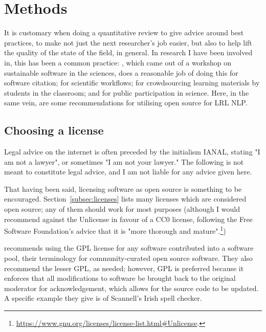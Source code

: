 \section{Methods}
\label{sec:methods}

It is customary when doing a quantitative review to give advice around best practices, to make not just the next researcher's job easier, but also to help lift the quality of the state of the field, in general. In research I have been involved in, this has been a common practice: \citet{DBLP:journals/corr/KatzCWHVHSJCCVL15}, which came out of a workshop on sustainable software in the sciences, does a reasonable job of doing this for software citation; \citet{LittIDCC} for scientific workflows; \citet{LittEdulearn} for crowdsourcing learning materials by students in the classroom; and \citet{wiggins2013data} for public participation in science. Here, in the same vein, are some recommendations for utilising open source for LRL NLP.

\subsection{Choosing a license}
\label{choosing-a-license}

Legal advice on the internet is often preceded by the initialism IANAL, stating "I am not a lawyer", or sometimes "I am not your lawyer." The following is not meant to constitute legal advice, and I am not liable for any advice given here.

That having been said, licensing software as open source is something to be encouraged. Section~\ref{subsec:licenses} lists many licenses which are considered open source; any of them should work for most purposes (although I would recommend against the Unlicense in favour of a CC0 license, following the Free Software Foundation's advice that it is "more thorough and mature".\footnote{\href{https://www.gnu.org/licenses/license-list.html\#Unlicense}{https://www.gnu.org/licenses/license-list.html\#Unlicense}. })

\citet{streiter2006implementing} recommends using the GPL license for any software contributed into a software pool, their terminology for community-curated open source software. They also recommend the lesser GPL, as needed; however, GPL is preferred because it enforces that all modifications to software be brought back to the original moderator for acknowledgement, which allows for the source code to be updated. A specific example they give is of Scannell's Irish spell checker.

